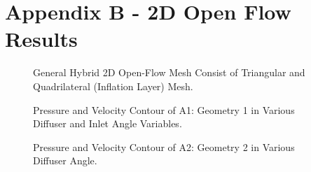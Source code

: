 \clearpage
\section*{Appendix B - 2D Open Flow Results} 

    


\begin{figure}[th]
    \noindent{}
    \caption{General Hybrid 2D Open-Flow Mesh Consist of Triangular and Quadrilateral (Inflation Layer) Mesh.}
    \label{fig:2D_OF_MESH}
\end{figure}


\begin{figure}[!ht]
    \noindent{}
    \caption{Pressure and Velocity Contour of A1: Geometry 1 in Various Diffuser and Inlet Angle Variables.}
    \label{fig:2D_OF_A1_CONTOUR}
\end{figure}

\begin{figure}
    \noindent{}
    \caption{Pressure and Velocity Contour of A2: Geometry 2 in Various Diffuser Angle.}
    \label{fig:2D_OF_A2_CONTOUR}
\end{figure}


